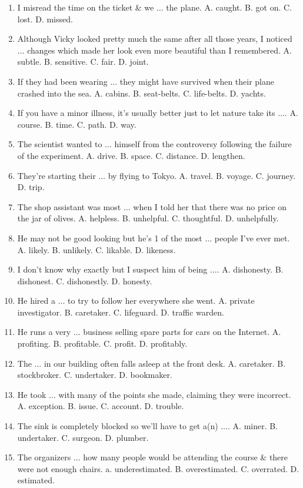 \documentclass{article}
\numberwithin{equation}{section}
\begin{document}
\begin{enumerate}[leftmargin=2mm]
	\item I misread the time on the ticket \& we $\ldots$ the plane. A. caught. B. got on. C. lost. D. missed.
	\item Although Vicky looked pretty much the same after all those years, I noticed $\ldots$ changes which made her look even more beautiful than I remembered. A. subtle. B. sensitive. C. fair. D. joint.
	\item If they had been wearing $\ldots$ they might have survived when their plane crashed into the sea. A. cabins. B. seat-belts. C. life-belts. D. yachts.
	\item If you have a minor illness, it's usually better just to let nature take its $\ldots$. A. course. B. time. C. path. D. way.
	\item The scientist wanted to $\ldots$ himself from the controversy following the failure of the experiment. A. drive. B. space. C. distance. D. lengthen.
	\item They're starting their $\ldots$ by flying to Tokyo. A. travel. B. voyage. C. journey. D. trip.
	\item The shop assistant was most $\ldots$ when I told her that there was no price on the jar of olives. A. helpless. B. unhelpful. C. thoughtful. D. unhelpfully.
	\item He may not be good looking but he's 1 of the most $\ldots$ people I've ever met. A. likely. B. unlikely. C. likable. D. likeness.
	\item I don't know why exactly but I suspect him of being $\ldots$. A. dishonesty. B. dishonest. C. dishonestly. D. honesty.
	\item He hired a $\ldots$ to try to follow her everywhere she went. A. private investigator. B. caretaker. C. lifeguard. D. traffic warden.
	\item He runs a very $\ldots$ business selling spare parts for cars on the Internet. A. profiting. B. profitable. C. profit. D. profitably.
	\item The $\ldots$ in our building often falls asleep at the front desk. A. caretaker. B. stockbroker. C. undertaker. D. bookmaker.
	\item He took $\ldots$ with many of the points she made, claiming they were incorrect. A. exception. B. issue. C. account. D. trouble.
	\item The sink is completely blocked so we'll have to get a(n) $\ldots$. A. miner. B. undertaker. C. surgeon. D. plumber.
	\item The organizers $\ldots$ how many people would be attending the course \& there were not enough chairs. a. underestimated. B. overestimated. C. overrated. D. estimated.

\end{enumerate}
\end{document}
